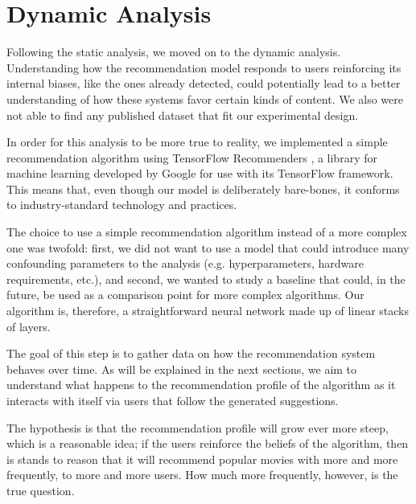 
\chapter{Dynamic Analysis}
\label{cap:dynamic}

Following the static analysis, we moved on to the dynamic analysis.
Understanding how the recommendation model responds to users reinforcing its
internal biases, like the ones already detected, could potentially lead to a
better understanding of how these systems favor certain kinds of content. We
also were not able to find any published dataset that fit our experimental
design.

In order for this analysis to be more true to reality, we implemented a simple
recommendation algorithm using TensorFlow Recommenders
\citep{noauthor_tensorflow_nodate}, a library for machine learning developed by
Google for use with its TensorFlow \citep{} framework. This means that, even %
though our model is deliberately bare-bones, it conforms to industry-standard
technology and practices.

The choice to use a simple recommendation algorithm instead of a more complex
one was twofold: first, we did not want to use a model that could introduce many
confounding parameters to the analysis (e.g. hyperparameters, hardware
requirements, etc.), and second, we wanted to study a baseline that could, in
the future, be used as a comparison point for more complex algorithms. Our
algorithm is, therefore, a straightforward neural network made up of linear
stacks of layers.

The goal of this step is to gather data on how the recommendation system behaves
over time. As will be explained in the next sections, we aim to understand what
happens to the recommendation profile of the algorithm as it interacts with
itself via users that follow the generated suggestions.

The hypothesis is that the recommendation profile will grow ever more steep,
which is a reasonable idea; if the users reinforce the beliefs of the algorithm,
then is stands to reason that it will recommend popular movies with more and
more frequently, to more and more users. How much more frequently, however, is
the true question.

